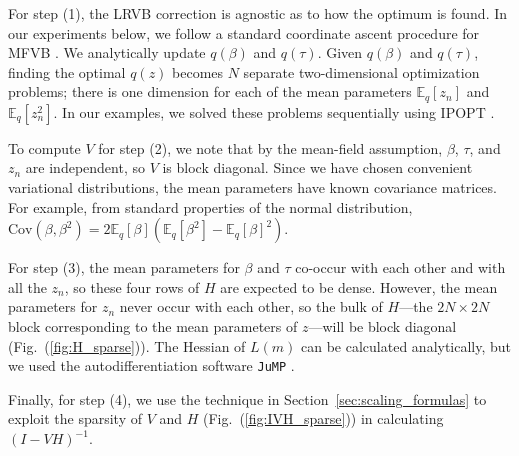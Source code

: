 \documentclass{article}\usepackage[]{graphicx}\usepackage[]{color}
\newcommand{\mysec}[1]{Section~\ref{sec:#1}}
\newcommand{\fig}[1]{Fig.~(\ref{fig:#1})}
\newcommand{\vbcov}{V} %
\newcommand{\mbeq}{\mathbb{E}_{q}}
\begin{document}
For step (1), the LRVB correction is agnostic as to how the optimum
is found. In our experiments below, we
follow a standard
coordinate ascent procedure for MFVB \citep{bishop:2006:pattern}. We analytically update
$q\left(\beta\right)$ and $q\left(\tau\right)$.
Given $q\left(\beta\right)$ and $q\left(\tau\right)$, finding the
optimal $q\left(z\right)$ becomes $N$ separate two-dimensional optimization
problems; there is one dimension for each of the mean parameters $\mbeq \left[ z_n \right]$ and $\mbeq \left[ z_n^2 \right]$.
In our examples, we solved these problems sequentially using
IPOPT \citep{ipopt:package}.

To compute $\vbcov$ for step (2),
we note that by the mean-field assumption,
$\beta$, $\tau$, and $z_{n}$ are independent, so $\vbcov$ is block
diagonal. Since we have chosen convenient variational distributions,
the mean parameters have known covariance matrices. For example, from
standard properties of the normal distribution,
$\textrm{Cov}\left(\beta,\beta^{2}\right)=2\mbeq\left[\beta\right]$$\left(\mbeq\left[\beta^{2}\right]-\mbeq\left[\beta\right]^{2}\right)$.

For step (3), the mean parameters for $\beta$ and $\tau$ co-occur with each other
and with all the $z_{n}$, so these four rows of $H$ are expected
to be dense. However, the mean parameters for $z_{n}$ never occur
with each other, so the bulk of $H$---the $2N\times2N$ block corresponding
to the mean parameters of $z$---will be block diagonal (\fig{H_sparse}).
The Hessian of $L\left(m\right)$ can be calculated analytically,
but we used the autodifferentiation software \texttt{JuMP} \citep{JuMP:LubinDunningIJOC}.

Finally, for step (4),
we use the technique in \mysec{scaling_formulas}
to exploit the sparsity of $\vbcov$ and $H$ (\fig{IVH_sparse}) in calculating $(I-VH)^{-1}$.
\end{document}
